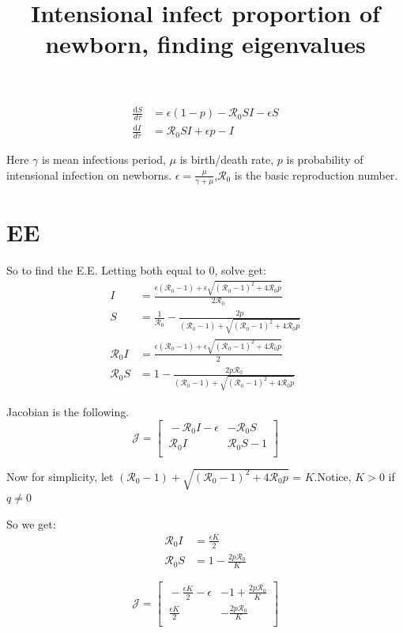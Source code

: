 \documentclass[12pt]{article}
\title{Intensional infect proportion of newborn, finding eigenvalues}
\begin{document}
\maketitle
\begin{align}
\frac{\mathrm{d}S}{d\tau}&=\epsilon(1-p)- \mathcal{R}_0  SI-\epsilon S \\
\frac{\mathrm{d}I}{d\tau}&=\mathcal{R}_0 SI+\epsilon p-I
\end{align}

Here $\gamma$ is mean infectious period, $\mu$ is birth/death rate, $p$ is probability of intensional infection on newborns. $\epsilon=\frac{\mu}{\gamma+\mu}$,$\mathcal{R}_0$ is the basic reproduction number.
\section{EE}
So to find the E.E. Letting both equal to 0, solve get:
\begin{align}
I &= \frac{\epsilon(\mathcal{R}_0 -1)+ \epsilon \sqrt{(\mathcal{R}_0-1)^2+4\mathcal{R}_0 p}}{2\mathcal{R}_0}\\
S &=\frac{1}{\mathcal{R}_0}-\frac{2p}{(\mathcal{R}_0 -1)+ \sqrt{(\mathcal{R}_0-1)^2+4\mathcal{R}_0 p}}\\
\mathcal{R}_0 I &= \frac{\epsilon(\mathcal{R}_0 -1)+ \epsilon \sqrt{(\mathcal{R}_0-1)^2+4\mathcal{R}_0 p}}{2}\\
\mathcal{R}_0 S &= 1-\frac{2p \mathcal{R}_0}{(\mathcal{R}_0 -1)+ \sqrt{(\mathcal{R}_0-1)^2+4\mathcal{R}_0 p}}
\end{align}

Jacobian is the following.
\begin{equation}
\mathcal{J} =
\begin{bmatrix}
    \ -\mathcal{R}_0 I-\epsilon       & -\mathcal{R}_0 S \\
    \ \mathcal{R}_0 I       & \mathcal{R}_0 S-1 \\
\end{bmatrix}
\end{equation}

Now for simplicity, let $(\mathcal{R}_0 -1)+ \sqrt{(\mathcal{R}_0-1)^2+4\mathcal{R}_0 p}$ = $K$.Notice, $K>0$ if $q\neq 0$

So we get:
\begin{align}
\mathcal{R}_0 I &= \frac{\epsilon K}{2}\\
\mathcal{R}_0 S &= 1-\frac{2p \mathcal{R}_0}{K}
\end{align}

\begin{equation}
\mathcal{J} =
\begin{bmatrix}
    \ -\frac{\epsilon K}{2}-\epsilon       & -1+\frac{2p \mathcal{R}_0}{K} \\
    \ \frac{\epsilon K}{2}       & -\frac{2p \mathcal{R}_0}{K} \\
\end{bmatrix}
\end{equation}
\end{document}
